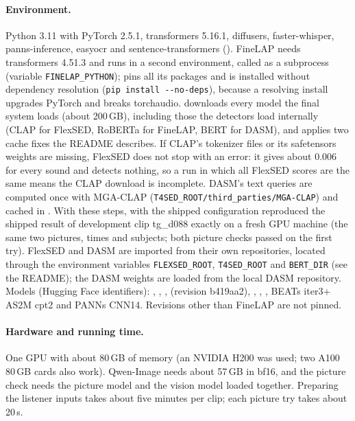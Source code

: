 \paragraph{Environment.} Python 3.11 with PyTorch 2.5.1, transformers 5.16.1, diffusers, faster-whisper, panns-inference,
easyocr and sentence-transformers (). FineLAP needs transformers 4.51.3 and runs in a second
environment, called as a subprocess (variable \texttt{FINELAP\_PYTHON});  pins all its
packages and is installed without dependency resolution (\texttt{pip install -{}-no-deps}), because a resolving install
upgrades PyTorch and breaks torchaudio.  downloads every model the final system loads (about
200\,GB), including those the detectors load internally (CLAP for FlexSED, RoBERTa for FineLAP, BERT for DASM), and
applies two cache fixes the README describes. If CLAP's tokenizer files or its safetensors weights are missing,
FlexSED does not stop with an error: it gives about 0.006 for every sound and detects nothing, so a run in which all
FlexSED scores are the same means the CLAP download is incomplete. DASM's text queries are computed once with
MGA-CLAP (\texttt{T4SED\_ROOT/third\_parties/MGA-CLAP}) and cached in . With these
steps,  with the shipped configuration reproduced the shipped result of development clip tg\_d088 exactly
on a fresh GPU machine (the same two pictures, times and subjects; both picture checks passed on the first try). FlexSED and DASM are imported from their own repositories, located through the
environment variables \texttt{FLEXSED\_ROOT}, \texttt{T4SED\_ROOT} and \texttt{BERT\_DIR} (see the README); the DASM
weights are loaded from the local DASM repository. Models (Hugging Face identifiers): , ,
,  (revision b419aa2), ,
, , BEATs iter3+ AS2M cpt2 and PANNs CNN14. Revisions
other than FineLAP are not pinned.

\paragraph{Hardware and running time.} One GPU with about 80\,GB of memory (an NVIDIA H200 was used; two A100 80\,GB
cards also work). Qwen-Image needs about 57\,GB in bf16, and the picture check needs the picture model and the vision
model loaded together. Preparing the listener inputs takes about five minutes per clip; each picture try takes about
20\,s.

